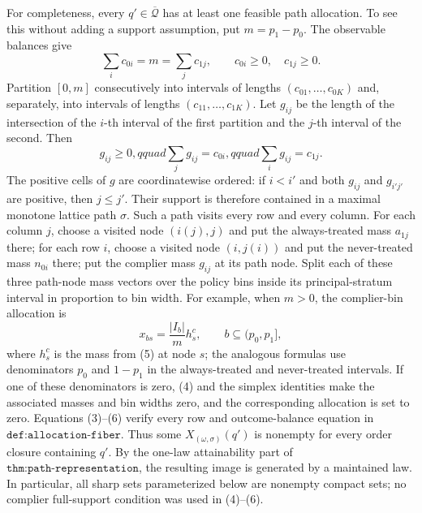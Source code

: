 For completeness, every \(q'\in\overline{\mathcal Q}\) has at least one feasible path allocation.  To see this without adding a support assumption, put \(m=p_1-p_0\).  The observable balances give
\[
 \sum_i c_{0i}=m=\sum_j c_{1j},\qquad c_{0i}\geq0,\quad c_{1j}\geq0.
 \tag{4}
\]
Partition \([0,m]\) consecutively into intervals of lengths \((c_{01},\ldots,c_{0K})\) and, separately, into intervals of lengths \((c_{11},\ldots,c_{1K})\).  Let \(g_{ij}\) be the length of the intersection of the \(i\)-th interval of the first partition and the \(j\)-th interval of the second.  Then
\[
 g_{ij}\geq0,qquad \sum_jg_{ij}=c_{0i},qquad \sum_ig_{ij}=c_{1j}.
 \tag{5}
\]
The positive cells of \(g\) are coordinatewise ordered: if \(i<i'\) and both \(g_{ij}\) and \(g_{i'j'}\) are positive, then \(j\leq j'\).  Their support is therefore contained in a maximal monotone lattice path \(\sigma\).  Such a path visits every row and every column.  For each column \(j\), choose a visited node \((i(j),j)\) and put the always-treated mass \(a_{1j}\) there; for each row \(i\), choose a visited node \((i,j(i))\) and put the never-treated mass \(n_{0i}\) there; put the complier mass \(g_{ij}\) at its path node.  Split each of these three path-node mass vectors over the policy bins inside its principal-stratum interval in proportion to bin width.  For example, when \(m>0\), the complier-bin allocation is
\[
 x_{bs}=\frac{|I_b|}{m}h^{c}_s,
 \qquad b\subseteq(p_0,p_1],
 \tag{6}
\]
where \(h^c_s\) is the mass from (5) at node \(s\); the analogous formulas use denominators \(p_0\) and \(1-p_1\) in the always-treated and never-treated intervals.  If one of these denominators is zero, (4) and the simplex identities make the associated masses and bin widths zero, and the corresponding allocation is set to zero.  Equations (3)--(6) verify every row and outcome-balance equation in \(\texttt{def:allocation-fiber}\).  Thus some \(X_{(\omega,\sigma)}(q')\) is nonempty for every order closure containing \(q'\).  By the one-law attainability part of \(\texttt{thm:path-representation}\), the resulting image is generated by a maintained law.  In particular, all sharp sets parameterized below are nonempty compact sets; no complier full-support condition was used in (4)--(6).

